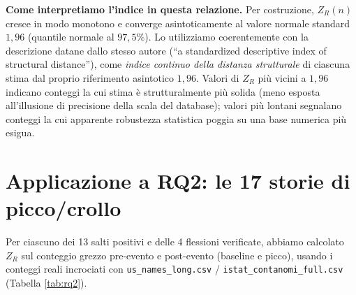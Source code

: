 \documentclass[conference]{IEEEtran}
\begin{document}
\textbf{Come interpretiamo l'indice in questa relazione.} Per costruzione, $Z_R(n)$ cresce in
modo monotono e converge asintoticamente al valore normale standard $1{,}96$ (quantile normale
al $97{,}5\%$). Lo utilizziamo coerentemente con la descrizione datane dallo stesso autore
(``a standardized descriptive index of structural distance''), come \emph{indice continuo della
distanza strutturale} di ciascuna stima dal proprio riferimento asintotico $1{,}96$. Valori di
$Z_R$ più vicini a $1{,}96$ indicano conteggi la cui stima è strutturalmente più solida (meno
esposta all'illusione di precisione della scala del database); valori più lontani segnalano
conteggi la cui apparente robustezza statistica poggia su una base numerica più esigua.

\section{Applicazione a RQ2: le 17 storie di picco/crollo}

Per ciascuno dei 13 salti positivi e delle 4 flessioni verificate, abbiamo calcolato $Z_R$ sul
conteggio grezzo pre-evento e post-evento (baseline e picco), usando i conteggi reali
incrociati con \texttt{us\_names\_long.csv} / \texttt{istat\_contanomi\_full.csv} (Tabella
\ref{tab:rq2}).
\end{document}
